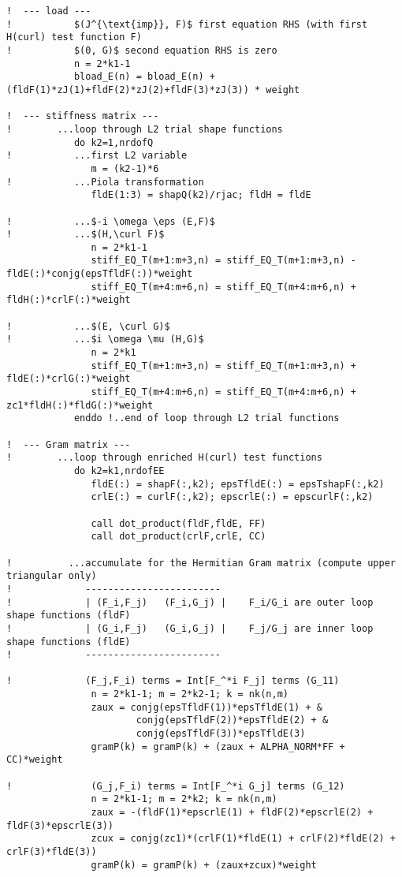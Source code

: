 \begin{lstlisting}[mathescape,caption=\file{MAXWELL/ULTRAWEAK\_DPG/}\routine{elem\_maxwell}: element integration]
!  --- load ---
!           $(J^{\text{imp}}, F)$ first equation RHS (with first H(curl) test function F)
!           $(0, G)$ second equation RHS is zero
            n = 2*k1-1
            bload_E(n) = bload_E(n) + (fldF(1)*zJ(1)+fldF(2)*zJ(2)+fldF(3)*zJ(3)) * weight

!  --- stiffness matrix ---
!        ...loop through L2 trial shape functions
            do k2=1,nrdofQ
!           ...first L2 variable
               m = (k2-1)*6
!           ...Piola transformation
               fldE(1:3) = shapQ(k2)/rjac; fldH = fldE

!           ...$-i \omega \eps (E,F)$
!           ...$(H,\curl F)$
               n = 2*k1-1
               stiff_EQ_T(m+1:m+3,n) = stiff_EQ_T(m+1:m+3,n) - fldE(:)*conjg(epsTfldF(:))*weight
               stiff_EQ_T(m+4:m+6,n) = stiff_EQ_T(m+4:m+6,n) + fldH(:)*crlF(:)*weight

!           ...$(E, \curl G)$
!           ...$i \omega \mu (H,G)$
               n = 2*k1
               stiff_EQ_T(m+1:m+3,n) = stiff_EQ_T(m+1:m+3,n) + fldE(:)*crlG(:)*weight
               stiff_EQ_T(m+4:m+6,n) = stiff_EQ_T(m+4:m+6,n) + zc1*fldH(:)*fldG(:)*weight
            enddo !..end of loop through L2 trial functions

!  --- Gram matrix ---
!        ...loop through enriched H(curl) test functions
            do k2=k1,nrdofEE
               fldE(:) = shapF(:,k2); epsTfldE(:) = epsTshapF(:,k2)
               crlE(:) = curlF(:,k2); epscrlE(:) = epscurlF(:,k2)

               call dot_product(fldF,fldE, FF)
               call dot_product(crlF,crlE, CC)

!          ...accumulate for the Hermitian Gram matrix (compute upper triangular only)
!             ------------------------
!             | (F_i,F_j)   (F_i,G_j) |    F_i/G_i are outer loop shape functions (fldF)
!             | (G_i,F_j)   (G_i,G_j) |    F_j/G_j are inner loop shape functions (fldE)
!             ------------------------

!             (F_j,F_i) terms = Int[F_^*i F_j] terms (G_11)
               n = 2*k1-1; m = 2*k2-1; k = nk(n,m)
               zaux = conjg(epsTfldF(1))*epsTfldE(1) + &
                       conjg(epsTfldF(2))*epsTfldE(2) + &
                       conjg(epsTfldF(3))*epsTfldE(3)
               gramP(k) = gramP(k) + (zaux + ALPHA_NORM*FF + CC)*weight

!              (G_j,F_i) terms = Int[F_^*i G_j] terms (G_12)
               n = 2*k1-1; m = 2*k2; k = nk(n,m)
               zaux = -(fldF(1)*epscrlE(1) + fldF(2)*epscrlE(2) + fldF(3)*epscrlE(3))
               zcux = conjg(zc1)*(crlF(1)*fldE(1) + crlF(2)*fldE(2) + crlF(3)*fldE(3))
               gramP(k) = gramP(k) + (zaux+zcux)*weight


\end{lstlisting}
